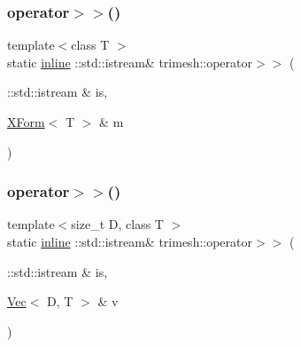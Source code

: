 \mbox{\label{namespacetrimesh_af30b096ef8c05b3a4024670f52fa42e2}} 
\subsubsection{\texorpdfstring{operator$>$$>$()}{operator>>()}\hspace{0.1cm}{\footnotesize\ttfamily [1/2]}}
{\footnotesize\ttfamily template$<$class T $>$ \\
static \hyperlink{XForm_8h_a00d24c7231be28dbaf71f5408f30e44c}{inline} \+::std\+::istream\& trimesh\+::operator$>$$>$ (\begin{DoxyParamCaption}\item[{\+::std\+::istream \&}]{is,  }\item[{\hyperlink{classtrimesh_1_1XForm}{X\+Form}$<$ T $>$ \&}]{m }\end{DoxyParamCaption})\hspace{0.3cm}{\ttfamily [static]}}

\mbox{\label{namespacetrimesh_ade316652ff80860499b6f566d597bc20}} 
\subsubsection{\texorpdfstring{operator$>$$>$()}{operator>>()}\hspace{0.1cm}{\footnotesize\ttfamily [2/2]}}
{\footnotesize\ttfamily template$<$size\+\_\+t D, class T $>$ \\
static \hyperlink{XForm_8h_a00d24c7231be28dbaf71f5408f30e44c}{inline} \+::std\+::istream\& trimesh\+::operator$>$$>$ (\begin{DoxyParamCaption}\item[{\+::std\+::istream \&}]{is,  }\item[{\hyperlink{classtrimesh_1_1Vec}{Vec}$<$ D, T $>$ \&}]{v }\end{DoxyParamCaption})\hspace{0.3cm}{\ttfamily [static]}}

\mbox{\label{namespacetrimesh_aa416d67511c8d651da54c871fc7905ec}} 
